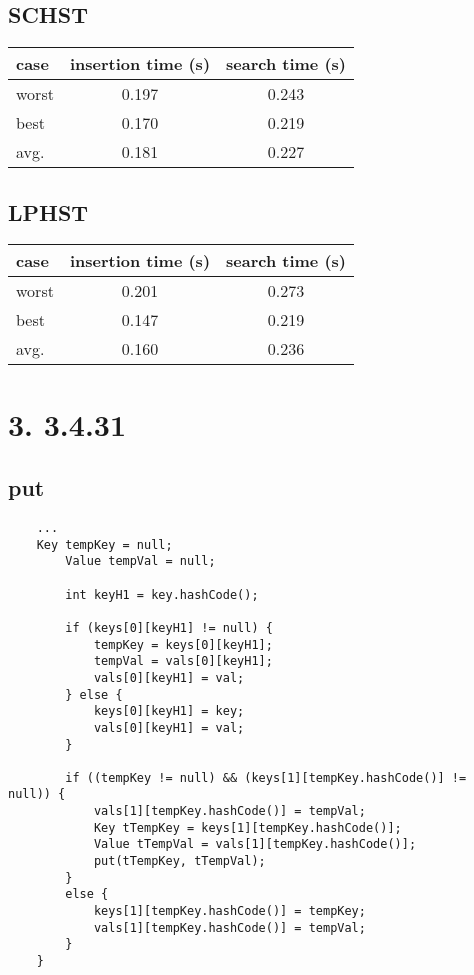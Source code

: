 \documentclass{article}
\begin{document}
\subsection*{SCHST}
\begin{tabular}{|l|c|c|}
    \hline
    case&insertion time (s)&search time (s)\\
    \hline
    worst&0.197&0.243\\
    \hline
    best&0.170&0.219\\
    \hline
    avg.&0.181&0.227\\
    \hline
\end{tabular}

\subsection*{LPHST}
\begin{tabular}{|l|c|c|}
    \hline
    case&insertion time (s)&search time (s)\\
    \hline
    worst&0.201&0.273\\
    \hline
    best&0.147&0.219\\
    \hline
    avg.&0.160&0.236\\
    \hline
\end{tabular}


\section*{3. 3.4.31}

\subsection*{put}
\begin{lstlisting}
    ...
    Key tempKey = null;
        Value tempVal = null;

        int keyH1 = key.hashCode();

        if (keys[0][keyH1] != null) {
            tempKey = keys[0][keyH1];
            tempVal = vals[0][keyH1];
            vals[0][keyH1] = val;
        } else {
            keys[0][keyH1] = key;
            vals[0][keyH1] = val;
        }

        if ((tempKey != null) && (keys[1][tempKey.hashCode()] != null)) {
            vals[1][tempKey.hashCode()] = tempVal;
            Key tTempKey = keys[1][tempKey.hashCode()];
            Value tTempVal = vals[1][tempKey.hashCode()];
            put(tTempKey, tTempVal);
        }
        else {
            keys[1][tempKey.hashCode()] = tempKey;
            vals[1][tempKey.hashCode()] = tempVal;
        }
    }
\end{lstlisting}
\end{document}
